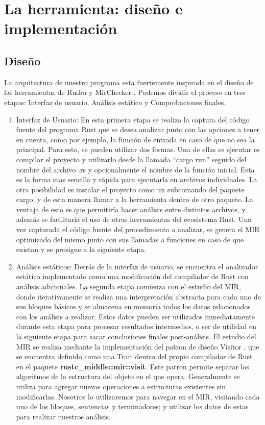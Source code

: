 \chapter{La herramienta: diseño e implementación}

\section{Diseño}

La arquitectura de nuestro programa esta fuertemente inspirada en el diseño de las herramientas de Rudra \cite{rudra} y MirChecker \cite{li2021mirchecker}. Podemos dividir el proceso en tres etapas: Interfaz de usuario, Análisis estático y Comprobaciones finales.

\begin{enumerate}
    \item Interfaz de Usuario: En esta primera etapa se realiza la captura del código fuente del programa Rust que se desea analizar junto con las opciones a tener en cuenta, como por ejemplo, la función de entrada en caso de que no sea la principal. Para esto, se pueden utilizar dos formas. Una de ellas es ejecutar es compilar el proyecto y utilizarlo desde la llamada ``cargo run'' seguido del nombre del archivo .rs y opcionalmente el nombre de la función inicial. Esta es la forma mas sencilla y rápida para ejecutarla en archivos individuales. La otra posibilidad es instalar el proyecto como un subcomando del paquete cargo, y de esta manera llamar a la herramienta dentro de otro paquete. La ventaja de esto es que permitiría hacer análisis entre distintos archivos, y además se facilitaría el uso de otras herramientas del ecosistema Rust. Una vez capturada el código fuente del procedimiento a analizar, se genera el MIR optimizado del mismo junto con sus llamadas a funciones en caso de que existan y se prosigue a la siguiente etapa.
    \item Análisis estáticos: Detrás de la interfaz de usuario, se encuentra el analizador estático implementado como una modificación del compilador de Rust con análisis adicionales. La segunda etapa comienza con el estudio del MIR, donde iterativamente se realiza una interpretación abstracta para cada uno de sus bloques básicos y se almacena en memoria todos los datos relacionados con los análisis a realizar. Estos datos pueden ser utilizados inmediatamente durante esta etapa para procesar resultados intermedios, o ser de utilidad en la siguiente etapa para sacar conclusiones finales post-análisis.
    El estudio del MIR se realiza mediante la implementación del patron de diseño Visitor \cite{ingienieriasoftware}, que se encuentra definido como una Trait dentro del propio compilador de Rust en el paquete \textbf{rustc\_middle::mir::visit}. Este patron permite separar los algoritmos de la estructura del objeto en el que opera. Generalmente se utiliza para agregar nuevas operaciones a estructuras existentes sin modificarlas. Nosotros lo utilizaremos para navegar en el MIR, visitando cada uno de los bloques, sentencias y terminadores; y utilizar los datos de estas para realizar nuestros análisis.

\end{enumerate}
